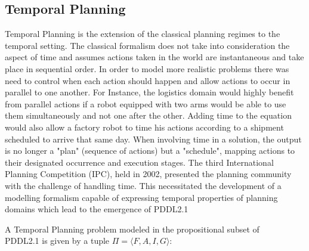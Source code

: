 \subsection{Temporal Planning}
\label{background: Temporal}
Temporal Planning is the extension of the classical planning regimes to the temporal setting.
 The classical formalism does not take into consideration the aspect of time and assumes actions taken in the world are instantaneous 
 and take place in sequential order. In order to model more realistic problems there was need to control when each action should happen 
 and allow actions to occur in parallel to one another. For Instance, the logistics domain would highly benefit from parallel actions 
 if a robot equipped with two arms would be able to use them simultaneously and not one after the other. Adding time to the equation 
 would also allow a factory robot to time his actions according to a shipment scheduled to arrive that same day. When involving time 
 in a solution, the output is no longer a "plan" (sequence of actions) but a "schedule", mapping actions to their designated occurrence 
 and execution stages.
The third International Planning Competition (IPC), held in 2002, presented the planning community with the challenge of handling time. 
This necessitated the development of a modelling formalism capable of expressing temporal properties of planning domains which lead to 
the emergence of PDDL2.1

A Temporal Planning problem modeled in the propositional subset of \\ 
PDDL2.1 \cite{fox2003pddl2} is given by a tuple $\Pi = \langle F,A,I,G \rangle$:


